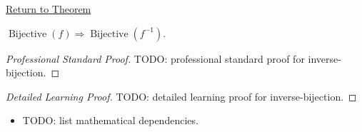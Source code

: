 \newpage
{}
\label{prf:inverse-bijection}

\begin{remark*}[Return]
\hyperref[prop:inverse-bijection]{Return to Theorem}
\end{remark*}

\begin{theorem*}
$\operatorname{Bijective}(f)\Rightarrow\operatorname{Bijective}(f^{-1})$.

\smallskip\noindent
\end{theorem*}

\begin{proof}[Professional Standard Proof]
\LRAProofBodyStart
TODO: professional standard proof for inverse-bijection.
\end{proof}

\begin{proof}[Detailed Learning Proof]
\LRAProofBodyStart
TODO: detailed learning proof for inverse-bijection.
\end{proof}

\begin{remark*}
\end{remark*}

\begin{dependencies}
\begin{itemize}
  \item TODO: list mathematical dependencies.
\end{itemize}
\end{dependencies}

\clearpage
